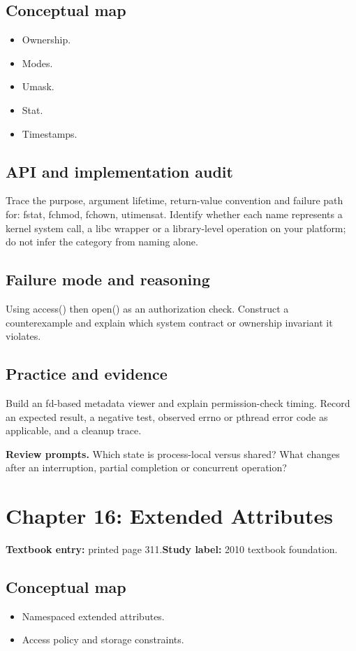 \documentclass[11pt,letterpaper,oneside]{report}
\begin{document}
\subsection{Conceptual map}
\begin{itemize}
\item Ownership.
\item Modes.
\item Umask.
\item Stat.
\item Timestamps.
\end{itemize}
\subsection{API and implementation audit}
Trace the purpose, argument lifetime, return-value convention and failure path for: fstat, fchmod, fchown, utimensat. Identify whether each name represents a kernel system call, a libc wrapper or a library-level operation on your platform; do not infer the category from naming alone.

\subsection{Failure mode and reasoning}
Using access() then open() as an authorization check. Construct a counterexample and explain which system contract or ownership invariant it violates.

\subsection{Practice and evidence}
Build an fd-based metadata viewer and explain permission-check timing. Record an expected result, a negative test, observed errno or pthread error code as applicable, and a cleanup trace.

\textbf{Review prompts.} Which state is process-local versus shared? What changes after an interruption, partial completion or concurrent operation?

\section{Chapter 16: Extended Attributes}
\textbf{Textbook entry:} printed page 311.\quad \textbf{Study label:} 2010 textbook foundation.

\subsection{Conceptual map}
\begin{itemize}
\item Namespaced extended attributes.
\item Access policy and storage constraints.
\end{itemize}
\end{document}
